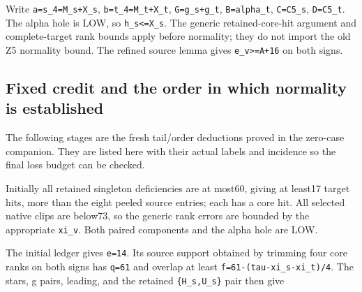 \documentclass[10pt,a4paper]{article}
\theoremstyle{definition}
\begin{document}
Write \texttt{a=\allowbreak{}s\_\allowbreak{}\allowbreak{}4=\allowbreak{}M\_\allowbreak{}\allowbreak{}s+\allowbreak{}X\_\allowbreak{}\allowbreak{}s},\allowbreak{}
\texttt{b=\allowbreak{}t\_\allowbreak{}\allowbreak{}4=\allowbreak{}M\_\allowbreak{}\allowbreak{}t+\allowbreak{}X\_\allowbreak{}\allowbreak{}t},\allowbreak{}
\texttt{G=\allowbreak{}g\_\allowbreak{}\allowbreak{}s+\allowbreak{}g\_\allowbreak{}\allowbreak{}t},\allowbreak{}
\texttt{B=\allowbreak{}alpha\_\allowbreak{}\allowbreak{}t},\allowbreak{} \texttt{C=\allowbreak{}C5\_\allowbreak{}\allowbreak{}s},\allowbreak{}
\texttt{D=\allowbreak{}C5\_\allowbreak{}\allowbreak{}t}. The alpha hole is LOW,\allowbreak{} so
\texttt{h\_\allowbreak{}\allowbreak{}s<=\allowbreak{}X\_\allowbreak{}\allowbreak{}s}. The generic retained-core-hit
argument and complete-target rank bounds apply before normality; they do
not import the old Z5 normality bound. The refined source lemma gives
\texttt{e\_\allowbreak{}\allowbreak{}v>=\allowbreak{}A+\allowbreak{}16} on both signs.

\hypertarget{fixed-credit-and-the-order-in-which-normality-is-established}{%
\subsection{Fixed credit and the order in which normality is
established}\label{fixed-credit-and-the-order-in-which-normality-is-established}}

The following stages are the fresh tail/order deductions proved in the
zero-case companion. They are listed here with their actual labels and
incidence so the final loss budget can be checked.

Initially all retained singleton deficiencies are at most60,\allowbreak{} giving at
least17 target hits,\allowbreak{} more than the eight peeled source entries; each has
a core hit. All selected native clips are below73,\allowbreak{} so the generic rank
errors are bounded by the appropriate \texttt{xi\_\allowbreak{}\allowbreak{}v}.
Both paired components and the alpha hole are LOW.

The initial ledger gives \texttt{e=\allowbreak{}14}. Its source
support obtained by trimming four core ranks on both signs has
\texttt{q=\allowbreak{}61} and overlap at least
\texttt{f=\allowbreak{}61-(tau-xi\_\allowbreak{}\allowbreak{}s-xi\_\allowbreak{}\allowbreak{}t)/\allowbreak{}4}. The stars,\allowbreak{} g pairs,\allowbreak{}
leading,\allowbreak{} and the retained \texttt{\{H\_\allowbreak{}\allowbreak{}s,\allowbreak{}U\_\allowbreak{}\allowbreak{}s\}} pair
then give
\end{document}
